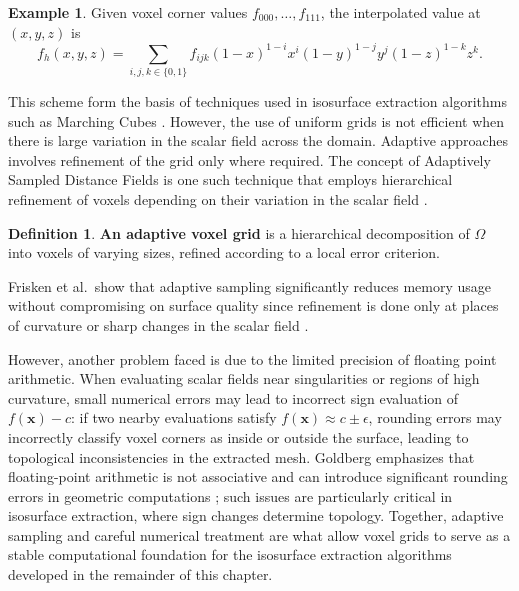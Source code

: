 \documentclass[12pt, a4paper, oneside]{book}
\theoremstyle{plain}
\theoremstyle{definition}
\newtheorem{definition}[theorem]{Definition}
\newtheorem{example}[theorem]{Example}
\theoremstyle{remark}
\theoremstyle{definition}
\begin{document}
\begin{example}
    Given voxel corner values $f_{000}, \dots, f_{111}$, the interpolated value at
    $(x,y,z)$ is
\[
f_h(x,y,z) = \sum_{i,j,k \in \{0,1\}} f_{ijk}(1-x)^{1-i}x^i(1-y)^{1-j}y^j
(1-z)^{1-k}z^k.
\]
\end{example}

This scheme form the basis of techniques used in isosurface extraction algorithms such as Marching Cubes \cite{lorensen1998marching}. However, the use of uniform grids is not efficient when there is large variation in the scalar field across the domain. Adaptive approaches involves refinement of the grid only where required. The concept of Adaptively Sampled Distance Fields is one such technique that employs hierarchical refinement of voxels depending on their variation in the scalar field \cite{frisken2000adaptively}.

\begin{definition}
\textbf{An adaptive voxel grid} is a hierarchical decomposition of $\Omega$ into voxels of varying sizes, refined according to a local error criterion.
\end{definition}

Frisken et al.\ show that adaptive sampling significantly reduces memory usage without compromising on surface quality since refinement is done only at places of curvature or sharp changes in the scalar field \cite{frisken2000adaptively}.

However, another problem faced is due to the limited precision of floating point arithmetic. When evaluating scalar fields near singularities or regions of high curvature, small numerical errors may lead to incorrect sign evaluation of $f(\mathbf{x}) - c$: if two nearby evaluations satisfy $f(\mathbf{x}) \approx c \pm \epsilon$, rounding errors may incorrectly classify voxel corners as inside or outside the surface, leading to topological inconsistencies in the extracted mesh. Goldberg emphasizes that floating-point arithmetic is not associative and can introduce significant rounding errors in geometric computations \cite{goldberg1991every}; such issues are particularly critical in isosurface extraction, where sign changes determine topology. Together, adaptive sampling and careful numerical treatment are what allow voxel grids to serve as a stable computational foundation for the isosurface extraction algorithms developed in the remainder of this chapter. 
\end{document}
